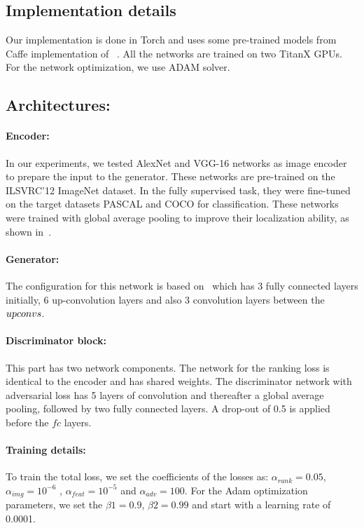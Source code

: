\documentclass[runningheads]{llncs}
\begin{document}
\subsection{Implementation details}
Our implementation is done in Torch and uses some pre-trained models from Caffe implementation of ~\cite{dosovitskiy2}. All the networks are trained on two TitanX GPUs. For the network optimization, we use ADAM solver.

\subsection*{Architectures:}
\paragraph*{Encoder:} In our experiments, we tested AlexNet and VGG-16 networks as image encoder to prepare the input to the generator. These networks are pre-trained on the ILSVRC'12 ImageNet dataset. In the fully supervised task, they were fine-tuned on the target datasets PASCAL and COCO for classification. These networks were trained with global average pooling to improve their localization ability, as shown in~\cite{diba,gap}.

\paragraph*{Generator:} The configuration for this network is based on~\cite{dosovitskiy2} which has 3 fully connected layers initially, 6 up-convolution layers and also 3 convolution layers between the $up\-convs$.

\paragraph*{Discriminator block:} This part has two network components. The network for the ranking loss is identical to the encoder and has shared weights. The discriminator network with adversarial loss has 5 layers of convolution and thereafter a global average pooling, followed by two fully connected layers. A drop-out of 0.5 is applied before the $fc$ layers.

\paragraph*{Training details:} To train the total loss, we set the coefficients of the losses as: $\alpha_{rank} = 0.05$, $\alpha_{img} = 10^{-6}$ , $\alpha_{feat} = 10^{-5}$ and $\alpha_{adv} = 100$. For the Adam optimization parameters, we set the $\beta{1} = 0.9$, $\beta{2} = 0.99$ and start with a learning rate of 0.0001.
\end{document}
